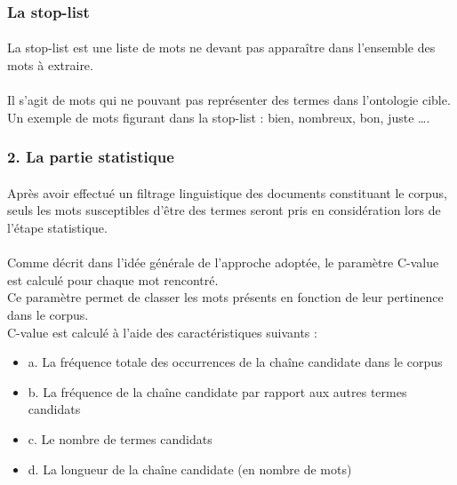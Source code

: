 \documentclass[12pt, a4paper, oneside]{book}
\begin{document}
\subsubsection{La stop-list}

\paragraph{}
La stop-list est une liste de mots ne devant pas apparaître dans l'ensemble des mots à extraire.
\paragraph{}
Il s'agit de mots qui ne pouvant pas représenter des termes dans l'ontologie cible. \\
Un exemple de mots figurant dans la stop-list : bien, nombreux, bon, juste …. 


\subsubsection{2. La partie statistique}
\paragraph{}
Après avoir effectué un filtrage linguistique des documents constituant le corpus,
seuls les mots susceptibles d'être des termes seront pris en considération lors de l'étape statistique.
\paragraph{}
Comme décrit dans l'idée générale de l'approche adoptée, le paramètre C-value est calculé pour chaque mot rencontré.\\
Ce paramètre permet de classer les mots présents en fonction de leur pertinence dans le corpus.\\
C-value est calculé à l'aide des caractéristiques suivants : \\
\begin{itemize}

\item a. La fréquence totale des occurrences de la chaîne candidate dans le corpus\\
\item b. La fréquence de la chaîne candidate par rapport aux autres termes candidats\\
\item c. Le nombre de termes candidats\\
\item d. La longueur de la chaîne candidate (en nombre de mots)\\


\end{itemize}
\end{document}

